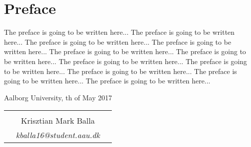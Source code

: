 \chapter*{Preface}

The preface is going to be written here... 
The preface is going to be written here... 
The preface is going to be written here... 
The preface is going to be written here... 
The preface is going to be written here... 
The preface is going to be written here... 
The preface is going to be written here... 
The preface is going to be written here... 
The preface is going to be written here... 
The preface is going to be written here... 
The preface is going to be written here... 

\hfill Aalborg University, th of May 2017




\vfill

\begin{table}[H]
	\centering
		\begin{tabular}{c c c}
			& \underline{\phantom{mmmmmmmmmmmmmmmmmmm}} 	& \\
			& Krisztian Mark Balla					& \\
			& \textit{kballa16@student.aau.dk}		& \\
		\end{tabular}
\end{table}